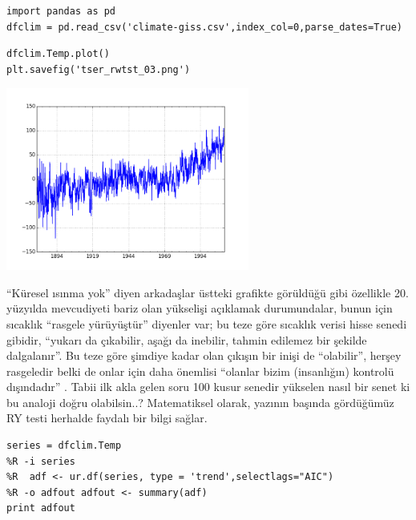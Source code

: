 \documentclass[12pt,fleqn]{article}\usepackage{../../common}
\begin{document}
\begin{verbatim}
import pandas as pd
dfclim = pd.read_csv('climate-giss.csv',index_col=0,parse_dates=True)
\end{verbatim}

\begin{verbatim}
dfclim.Temp.plot()
plt.savefig('tser_rwtst_03.png')
\end{verbatim}

\includegraphics[height=6cm]{tser_rwtst_03.png}

``Küresel ısınma yok'' diyen arkadaşlar üstteki grafikte görüldüğü gibi
özellikle 20. yüzyılda mevcudiyeti bariz olan yükselişi açıklamak
durumundalar, bunun için sıcaklık ``rasgele yürüyüştür'' diyenler var; bu
teze göre sıcaklık verisi hisse senedi gibidir, ``yukarı da çıkabilir,
aşağı da inebilir, tahmin edilemez bir şekilde dalgalanır''. Bu teze göre
şimdiye kadar olan çıkışın bir inişi de ``olabilir'', herşey rasgeledir
belki de onlar için daha önemlisi ``olanlar bizim (insanlığın) kontrolü
dışındadır'' . Tabii ilk akla gelen soru 100 kusur senedir yükselen nasıl
bir senet ki bu analoji doğru olabilsin..? Matematiksel olarak, yazının
başında gördüğümüz RY testi herhalde faydalı bir bilgi sağlar.

\begin{verbatim}
series = dfclim.Temp
%R -i series
%R  adf <- ur.df(series, type = 'trend',selectlags="AIC")
%R -o adfout adfout <- summary(adf)
print adfout
\end{verbatim}
\end{document}
